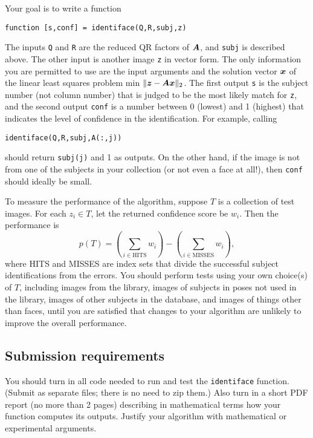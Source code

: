 \documentclass[11pt,twoside]{article}
\begin{document}
Your goal is to write a function
\begin{verbatim}
function [s,conf] = identiface(Q,R,subj,z)
\end{verbatim}
The inputs \texttt{Q} and \texttt{R} are the reduced QR factors of $\bm{A}$, and \texttt{subj} is described above. The other input is another image \texttt{z} in vector form. The only information you are permitted to use are the input arguments and the solution vector $\bm{x}$ of the linear least squares problem min $\|\bm{z}-\bm{A}\bm{x}\|_2$. The first output \texttt{s} is the subject number (not column number) that is judged to be the most likely match for \texttt{z}, and the second output \texttt{conf} is a number between 0 (lowest) and 1 (highest) that indicates the level of confidence in the identification.
For example, calling
\begin{verbatim}
identiface(Q,R,subj,A(:,j))
\end{verbatim}
should return \texttt{subj(j)} and 1 as outputs. On the other hand, if the image is not from one of the subjects in your collection (or not even a face at all!), then \texttt{conf} should ideally be small. 

To measure the performance of the algorithm, suppose $T$ is a collection of test images. For each $z_i\in T$, let the returned confidence score be $w_i$. Then the performance is
\begin{equation}
  \label{eq:faceoff2}
  p(T) = \left( \sum_{i\in \text{HITS}} w_i \right) -
  \left( \sum_{i\in \text{MISSES}} w_i \right),
\end{equation}
where HITS and MISSES are index sets that divide the successful subject identifications from the errors. You should perform tests using your own choice(s) of $T$, including images from the library, images of subjects in poses not used in the library, images of other subjects in the database, and images of things other than faces, until you are satisfied that changes to your algorithm are unlikely to improve the overall performance. 

\subsection*{Submission requirements}
\label{sec:subm-requ}

You should turn in all code needed to run and test the \texttt{identiface} function. (Submit as separate files; there is no need to zip them.) Also turn in a short PDF report (no more than 2 pages) describing in mathematical terms how your function computes its outputs. Justify your algorithm with mathematical or experimental arguments. 
\end{document}
